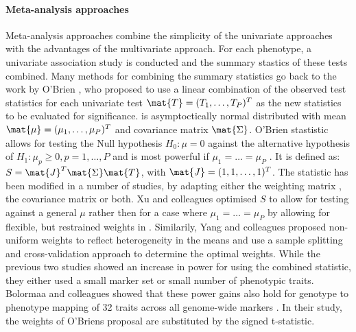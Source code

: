 \paragraph{Meta-analysis approaches} Meta-analysis approaches combine the simplicity of the univariate approaches with the advantages of the multivariate approach. For each phenotype, a univariate association study is conducted and the summary stastics of these tests combined. Many methods for combining the summary statistics \citep{Xu2003,Yang2010,Yang2012,Bolormaa2014} go back to the work by O'Brien \citep{O'Brien1984}, who proposed to use a linear combination of the observed test statistics for each univariate test \(\mat{T} =(T_1, \dots, T_P)^T\) as the new statistics to be evaluated for significance.   is asymptoctically normal distributed with mean \(\mat{\mu} = (\mu_1,\ldots, \mu_P)^T\) and covariance matrix \(\mat{\Sigma}\). O'Brien stastistic allows for testing the Null hypothesis \(H_0: \mu = 0\) against the alternative hypothesis of  \(H_1: \mu_p \ge 0, p=1, \ldots , P \) and is most powerful if \(\mu_1= \ldots =\mu_P\) \citep{Xu2003}. It is defined as: \(S = \mat{J}^T \mat{\Sigma}\mat{T}\), with \(\mat{J} = (1, 1, \ldots, 1)^T\).  The statistic has been modified in a number of studies, by adapting either the weighting matrix , the covariance matrix \tmat{\Sigma} or both. Xu and colleagues \citeyear{Xu2003} optimised \(S\) to allow for testing against a general \(\mu\) rather then for a case where  \(\mu_1= \ldots =\mu_P\) by allowing for flexible, but restrained weights in . Similarily, Yang and colleagues  \citeyear{Yang2010} proposed non-uniform weights to reflect heterogeneity in the means and use a sample splitting and cross-validation approach to determine the optimal weights. 
While the previous two studies showed an increase in power for using the combined statistic, they either used a small marker set or small number of phenotypic traits.  Bolormaa and colleagues showed that these power gains also hold for genotype to phenotype mapping of 32 traits across all genome-wide markers \citep{Bolormaa2014}. In their study, the weights of O'Briens proposal are substituted by the signed t-statistic. 

